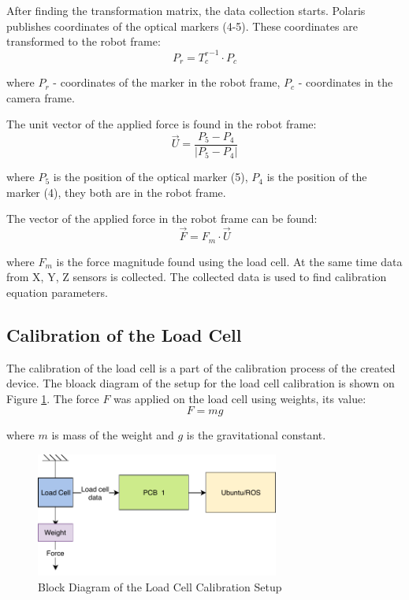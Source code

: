 	After finding the transformation matrix, the data collection starts. Polaris publishes coordinates of the optical markers (4-5). These coordinates are transformed to the robot frame:
\begin{equation}
P_{r} = {T_{c}^{ r}}^{-1} \cdot P_{c}
\end{equation}

	where $P_{r}$ - coordinates of the marker in the robot frame, $P_{c}$ - coordinates in the camera frame.
	
	The unit vector of the applied force is found in the robot frame:
\begin{equation}
\vec{U} = \frac{P_{5} - P_{4}}{|P_{5} - P_{4}|}
\end{equation}
	
	where $P_{5}$ is the position of the optical marker (5), $P_{4}$ is the position of the marker (4), they both are in the robot frame.
	
	The vector of the applied force in the robot frame can be found:
\begin{equation}
\vec{F} = F_{m} \cdot \vec{U}
\end{equation}

	where $F_{m}$ is the force magnitude found using the load cell.
	At the same time data from X, Y, Z sensors is collected. The collected data is used to find calibration equation parameters.
	
	\subsection{Calibration of the Load Cell}
	\label{sec:CalLoadCell}
	The calibration of the load cell is a part of the calibration process of the created device. The bloack diagram of the setup for the load cell calibration is shown on Figure \ref{fig:Calib_setup_LC}. The force $F$ was applied on the load cell using weights, its value: 
\begin{equation}
F = mg
\end{equation}

	where $m$ is mass of the weight and $g$ is the gravitational constant.

\begin{figure}[h]
	\begin{center}
	\includegraphics[width=80mm]{fig/methods/Load_Cell_Calibration.pdf}
	\end{center}
	\vspace{-4mm}
	\caption[Load Cell Calibration]
	{Block Diagram of the Load Cell Calibration Setup}
	\label{fig:Calib_setup_LC}
	\vspace{-2mm}
\end{figure}

